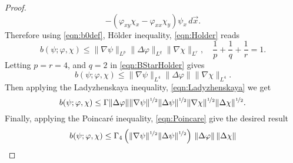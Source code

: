 \begin{proof}
\begin{equation}
      - (\varphi_{xy} \chi_x - \varphi_{xx} \chi_y) \psi_x \, d\vec{x}.
    \label{eqn:b0def}
  \end{equation}
  Therefore using \eqref{eqn:b0def}, H\"older inequality, \eqref{eqn:Holder} reads
  \begin{equation}
    b(\psi; \varphi, \chi) \le \|\nabla \psi\|_{L^p} \|\Delta \varphi\|_{L^q}
    \|\nabla \chi\|_{L^r},\quad \frac{1}{p} + \frac{1}{q} + \frac{1}{r} = 1.
    \label{eqn:BStarHolder}
  \end{equation}
  Letting $p = r = 4$, and $q = 2$ in \eqref{eqn:BStarHolder} gives
  \begin{equation*}
    b(\psi; \varphi, \chi) \le \|\nabla \psi\|_{L^4} \|\Delta \varphi\|
    \|\nabla \chi\|_{L^4}.
  \end{equation*}
  Then applying the Ladyzhenskaya inequality, \eqref{eqn:Ladyzhenskaya} we get
  \begin{equation*}
    b(\psi;\varphi,\chi) \le \Gamma \|\Delta \varphi\|
      \|\nabla \psi\|^{\nicefrac{1}{2}} \|\Delta \psi\|^{\nicefrac{1}{2}}
      \|\nabla \chi\|^{\nicefrac{1}{2}} \|\Delta \chi\|^{\nicefrac{1}{2}}.
  \end{equation*}
  Finally, applying the Poincar\'e inequality, \eqref{eqn:Poincare} give the desired result
  \begin{equation*}
    b(\psi;\varphi,\chi) \le \Gamma_4 \left(\|\nabla \psi\|^{\nicefrac{1}{2}}
      \|\Delta \psi\|^{\nicefrac{1}{2}}\right)\,
      \|\Delta \varphi\|\, \|\Delta \chi\|
  \end{equation*}
\end{proof}

